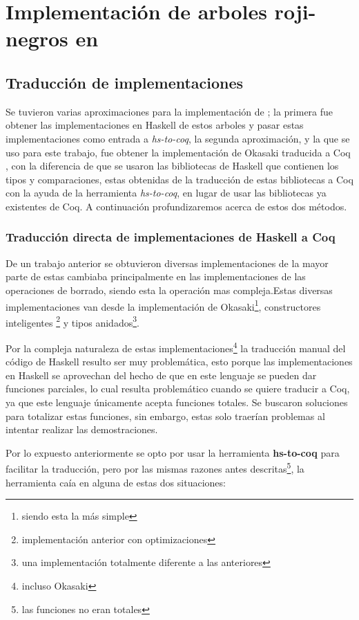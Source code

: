 \chapter{Implementación de arboles roji-negros en {\coq}}

\section{Traducción de implementaciones}
Se tuvieron varias aproximaciones para la implementación de {\arns}; la primera fue obtener las
implementaciones en Haskell de estos arboles \cite{tesisG} y pasar estas implementaciones como
entrada a \textit{hs-to-coq}, la segunda aproximación, y la que se uso para este trabajo, fue
obtener la implementación de Okasaki traducida a Coq \cite{MSetRBT}, con la diferencia de que se
usaron las bibliotecas de Haskell que contienen los tipos y comparaciones, estas obtenidas de la
traducción de estas bibliotecas a Coq con la ayuda de la herramienta \textit{hs-to-coq}, en lugar
de usar las bibliotecas ya existentes de Coq. A continuación profundizaremos acerca de estos dos
métodos.

\subsection{Traducción directa de implementaciones de Haskell a Coq}
De un trabajo anterior\cite{tesisG} se obtuvieron diversas implementaciones de {\arns} la mayor
parte de estas cambiaba principalmente en las implementaciones de las operaciones de borrado,
siendo esta la operación mas compleja.Estas diversas implementaciones van desde la implementación
de Okasaki\footnote{siendo esta la m\'as simple}, constructores inteligentes
\footnote{implementaci\'on anterior con optimizaciones} y tipos anidados\footnote{una
implementaci\'on totalmente diferente a las anteriores}.

Por la compleja naturaleza de estas implementaciones\footnote{incluso Okasaki} la traducción
manual del código de Haskell resulto ser muy problemática, esto porque las implementaciones en
Haskell se aprovechan del hecho de que en este lenguaje se pueden dar funciones parciales, lo cual
resulta problemático cuando se quiere traducir a Coq, ya que este lenguaje únicamente acepta
funciones totales. Se buscaron soluciones para totalizar estas funciones, sin embargo, estas solo
traerían problemas al intentar realizar las demostraciones.

Por lo expuesto anteriormente se opto por usar la herramienta \textbf{hs-to-coq} para facilitar la
traducci\'on, pero por las mismas razones antes descritas\footnote{las funciones no eran totales},
la herramienta caía en alguna de estas dos situaciones:

